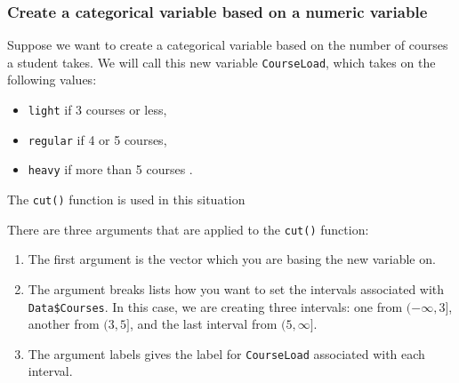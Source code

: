 \documentclass[
]{book}
\newenvironment{Shaded}{\begin{snugshade}}{\end{snugshade}}
\newcommand{\AttributeTok}[1]{\textcolor[rgb]{0.13,0.29,0.53}{#1}}
\newcommand{\ConstantTok}[1]{\textcolor[rgb]{0.56,0.35,0.01}{#1}}
\newcommand{\DecValTok}[1]{\textcolor[rgb]{0.00,0.00,0.81}{#1}}
\newcommand{\FunctionTok}[1]{\textcolor[rgb]{0.13,0.29,0.53}{\textbf{#1}}}
\newcommand{\NormalTok}[1]{#1}
\newcommand{\OtherTok}[1]{\textcolor[rgb]{0.56,0.35,0.01}{#1}}
\newcommand{\SpecialCharTok}[1]{\textcolor[rgb]{0.81,0.36,0.00}{\textbf{#1}}}
\newcommand{\StringTok}[1]{\textcolor[rgb]{0.31,0.60,0.02}{#1}}
\providecommand{\tightlist}{%
  \setlength{\itemsep}{0pt}\setlength{\parskip}{0pt}}
\begin{document}
\hypertarget{create-a-categorical-variable-based-on-a-numeric-variable}{%
\subsubsection{Create a categorical variable based on a numeric variable}\label{create-a-categorical-variable-based-on-a-numeric-variable}}

Suppose we want to create a categorical variable based on the number of courses a student takes. We will call this new variable \texttt{CourseLoad}, which takes on the following values:

\begin{itemize}
\tightlist
\item
  \texttt{light} if 3 courses or less,
\item
  \texttt{regular} if 4 or 5 courses,
\item
  \texttt{heavy} if more than 5 courses .
\end{itemize}

The \texttt{cut()} function is used in this situation

\begin{Shaded}
\end{Shaded}

There are three arguments that are applied to the \texttt{cut()} function:

\begin{enumerate}
\def\labelenumi{\arabic{enumi}.}
\item
  The first argument is the vector which you are basing the new variable on.
\item
  The argument breaks lists how you want to set the intervals associated with \texttt{Data\$Courses}. In this case, we are creating three intervals: one from \((-\infty, 3]\), another from \((3, 5]\), and the last interval from \((5, \infty]\).
\item
  The argument labels gives the label for \texttt{CourseLoad} associated with each interval.
\end{enumerate}
\end{document}
